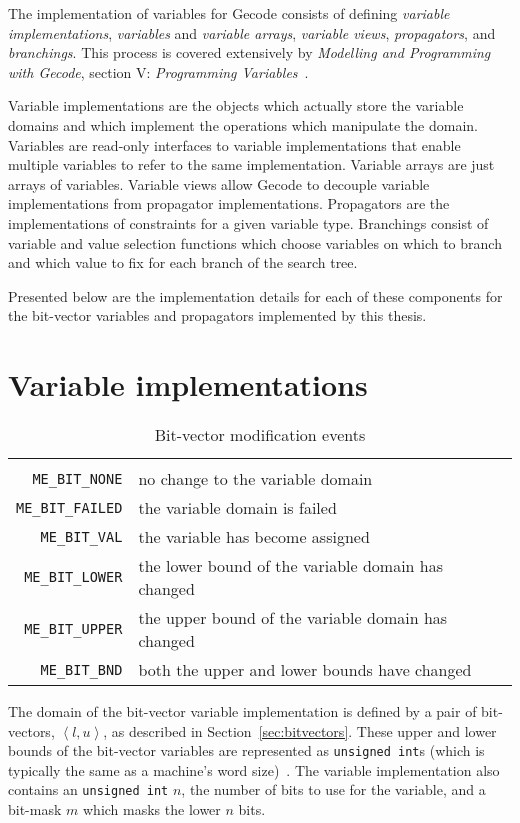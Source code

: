 \documentclass[a4paper,10pt,twoside,openright]{book}
\newcommand{\bh}[1]{\text{\fontfamily{\sfdefault}\selectfont\textbf{#1}}}
\newcommand{\tuple}[1]{\left\langle #1\right\rangle}
\newcommand*\cd[1]{\texttt{#1}}
\begin{document}
The implementation of variables for Gecode 
consists of defining \textit{variable implementations}, \textit{variables} and \textit{variable arrays}, \textit{variable views}, \textit{propagators}, and \textit{branchings}. This process is covered extensively by 
\textit{Modelling and Programming with Gecode}, section V: \textit{Programming Variables}~\cite{MPG:V}. 

Variable implementations are the objects which actually store the variable domains and which implement the operations which manipulate the domain.
Variables are read-only interfaces to variable implementations that enable multiple variables to refer to the same implementation.
Variable arrays are just arrays of variables. 
Variable views allow Gecode to decouple variable implementations from propagator implementations.
Propagators are the implementations of constraints for a given variable type.
Branchings consist of variable and value selection functions which 
choose variables on which to branch 
and which value to fix for each branch of the search tree.

Presented below are the implementation details for each of these components for the bit-vector variables and propagators implemented by this thesis. 

\section{Variable implementations}
\begin{table}[t]
    \small
    \begin{tabularx}{\linewidth}{ r X }
        \bh{modification event} & \bh{description} \\
        \cd{ME_BIT_NONE}	&	no change to the variable domain\\
        \cd{ME_BIT_FAILED}	&	the variable domain is failed\\
        \cd{ME_BIT_VAL}	&	the variable has become assigned\\
        \cd{ME_BIT_LOWER}	&	the lower bound of the variable domain has changed\\
        \cd{ME_BIT_UPPER}	&	the upper bound of the variable domain has changed\\
        \cd{ME_BIT_BND}	&	both the upper and lower bounds have changed\\
    \end{tabularx}
    \caption{Bit-vector modification events}
    \label{tab:me}
\end{table}
The domain of the bit-vector variable implementation is defined by a pair of bit-vectors, $\tuple{l,u}$, as described in Section~\ref{sec:bitvectors}. These upper and lower bounds of the bit-vector variables are represented as \cd{unsigned int}s (which is typically the same as a machine's word size)~\cite{nyhoff2012programming}. The variable implementation also contains an \cd{unsigned int} $n$, the number of bits to use for the variable, and a bit-mask $m$ which masks the lower $n$ bits.
\end{document}
